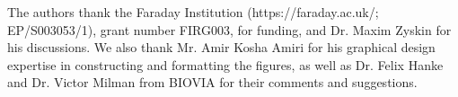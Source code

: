 \documentclass[journal=jacsat,manuscript=article]{achemso}
\begin{document}

\begin{acknowledgement}
The authors thank the Faraday Institution (https://faraday.ac.uk/; EP/S003053/1), grant number FIRG003, for funding, and Dr. Maxim Zyskin for his discussions. We also thank Mr. Amir Kosha Amiri for his graphical design expertise in constructing and formatting the figures, as well as Dr. Felix Hanke and Dr. Victor Milman from BIOVIA for their comments and suggestions. 


\end{acknowledgement}
\end{document}
